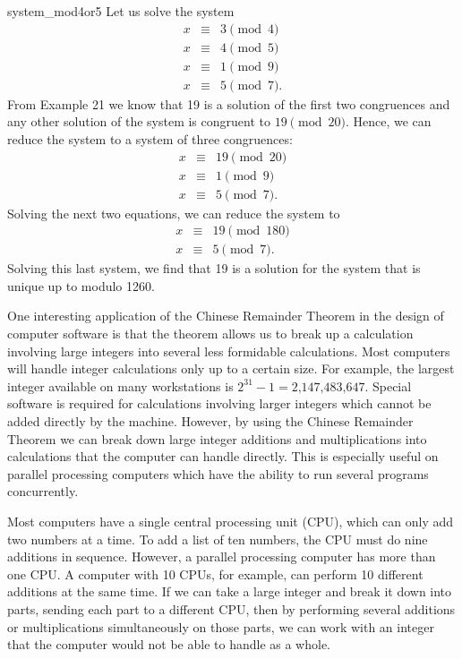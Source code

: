  
\begin{example}{system_mod4or5}
Let us solve the system
\begin{eqnarray*}
x & \equiv & 3 \pmod{4} \\
x & \equiv & 4 \pmod{5} \\
x & \equiv & 1 \pmod{9} \\
x & \equiv & 5 \pmod{7}. 
\end{eqnarray*}
From Example 21 we know that 19 is a solution of the first two
congruences and any other solution of the system is congruent to $19
\pmod{20}$. Hence, we can reduce the system to a system of three 
congruences:
\begin{eqnarray*}
x & \equiv & 19 \pmod{20} \\
x & \equiv & 1 \pmod{9} \\
x & \equiv & 5 \pmod{7}. 
\end{eqnarray*}
Solving the next two equations, we can reduce the system to
\begin{eqnarray*}
x & \equiv & 19 \pmod{180} \\
x & \equiv & 5 \pmod{7}. 
\end{eqnarray*}
Solving this last system, we find that 19 is a solution for the system
that is unique up to modulo 1260.
\end{example}
 
 
One interesting application of the Chinese Remainder Theorem in the
design of computer software is that the theorem allows us to break up
a calculation involving large integers into several less formidable
calculations. Most computers will handle integer calculations only up
to a certain size.  For example, the largest integer available on many
workstations is $2^{31} - 1 = \mbox{2,147,483,647}$.  Special
software is required for calculations involving larger integers which 
cannot be added directly by the machine.  However, by using the Chinese
Remainder Theorem we can break down large integer additions and
multiplications into calculations that the computer can handle
directly. This is especially useful on parallel processing computers
which have the ability to
run several programs concurrently. 
 
Most computers have a single central
processing unit (CPU), which can only add two numbers at a time. To add 
a list of ten numbers, the CPU must do nine additions
in sequence. However, a parallel processing computer has more than
one CPU. A computer with 10 CPUs, for example,  can perform 10
different additions at the same time. If we can take a large integer 
and break
it down into parts, sending each part to a different CPU, then by
performing several additions or multiplications
simultaneously on those parts, we can work with an integer that the
computer would not be able to handle as a whole.  
 
